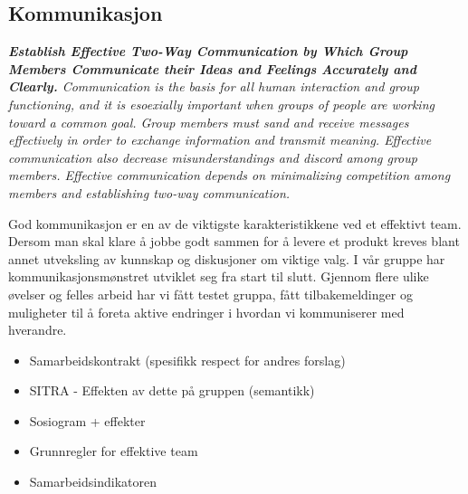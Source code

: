 \subsection{Kommunikasjon}


\textit{
\textbf{
Establish Effective Two-Way Communication by Which Group Members Communicate their Ideas and Feelings Accurately and Clearly.
}
Communication is the basis for all human interaction and group functioning, and it is esoexially important when groups of people are working toward a common goal.
Group members must sand and receive messages effectively in order to exchange information and transmit meaning.
Effective communication also decrease misunderstandings and discord among group members.
Effective communication depends on minimalizing competition among members and establishing two-way communication.
}
\cite{group_dynamics}

God kommunikasjon er en av de viktigste karakteristikkene ved et effektivt team.
Dersom man skal klare å jobbe godt sammen for å levere et produkt kreves blant annet utveksling av kunnskap og diskusjoner om viktige valg.
I vår gruppe har kommunikasjonsmønstret utviklet seg fra start til slutt.
Gjennom flere ulike øvelser og felles arbeid har vi fått testet gruppa, fått tilbakemeldinger og muligheter til å foreta aktive endringer i hvordan vi kommuniserer med hverandre.

\begin{itemize}
\item Samarbeidskontrakt (spesifikk respect for andres forslag)
\item SITRA - Effekten av dette på gruppen (semantikk)
\item Sosiogram + effekter
\item Grunnregler for effektive team
\item Samarbeidsindikatoren
\end{itemize}


%
%



